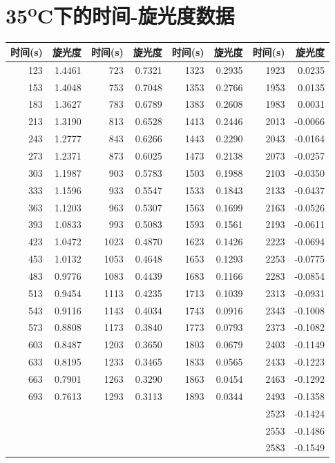 \documentclass[11pt]{report}
\begin{document}
\section{35\textsuperscript{o}C下的时间-旋光度数据}
\label{sec:org1ac3f67}
\begin{center}
\begin{tabular}{rrrrrrrr}
时间(s) & 旋光度 & 时间(s) & 旋光度 & 时间(s) & 旋光度 & 时间(s) & 旋光度\\
\hline
123 & 1.4461 & 723 & 0.7321 & 1323 & 0.2935 & 1923 & 0.0235\\
153 & 1.4048 & 753 & 0.7048 & 1353 & 0.2766 & 1953 & 0.0135\\
183 & 1.3627 & 783 & 0.6789 & 1383 & 0.2608 & 1983 & 0.0031\\
213 & 1.3190 & 813 & 0.6528 & 1413 & 0.2446 & 2013 & -0.0066\\
243 & 1.2777 & 843 & 0.6266 & 1443 & 0.2290 & 2043 & -0.0164\\
273 & 1.2371 & 873 & 0.6025 & 1473 & 0.2138 & 2073 & -0.0257\\
303 & 1.1987 & 903 & 0.5783 & 1503 & 0.1988 & 2103 & -0.0350\\
333 & 1.1596 & 933 & 0.5547 & 1533 & 0.1843 & 2133 & -0.0437\\
363 & 1.1203 & 963 & 0.5307 & 1563 & 0.1699 & 2163 & -0.0526\\
393 & 1.0833 & 993 & 0.5083 & 1593 & 0.1561 & 2193 & -0.0611\\
423 & 1.0472 & 1023 & 0.4870 & 1623 & 0.1426 & 2223 & -0.0694\\
453 & 1.0132 & 1053 & 0.4648 & 1653 & 0.1293 & 2253 & -0.0775\\
483 & 0.9776 & 1083 & 0.4439 & 1683 & 0.1166 & 2283 & -0.0854\\
513 & 0.9454 & 1113 & 0.4235 & 1713 & 0.1039 & 2313 & -0.0931\\
543 & 0.9116 & 1143 & 0.4034 & 1743 & 0.0916 & 2343 & -0.1008\\
573 & 0.8808 & 1173 & 0.3840 & 1773 & 0.0793 & 2373 & -0.1082\\
603 & 0.8487 & 1203 & 0.3650 & 1803 & 0.0679 & 2403 & -0.1149\\
633 & 0.8195 & 1233 & 0.3465 & 1833 & 0.0565 & 2433 & -0.1223\\
663 & 0.7901 & 1263 & 0.3290 & 1863 & 0.0454 & 2463 & -0.1292\\
693 & 0.7613 & 1293 & 0.3113 & 1893 & 0.0344 & 2493 & -0.1358\\
 &  &  &  &  &  & 2523 & -0.1424\\
 &  &  &  &  &  & 2553 & -0.1486\\
 &  &  &  &  &  & 2583 & -0.1549\\
\end{tabular}
\end{center}
\end{document}
